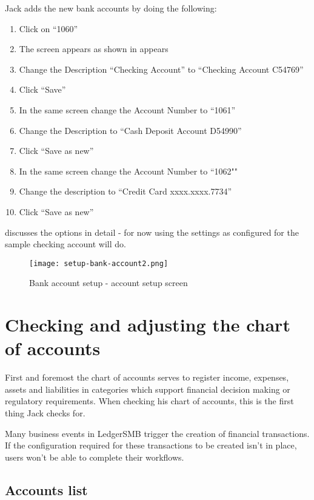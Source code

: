 Jack adds the new bank accounts by doing the following:

\begin{enumerate}
\item Click on ``1060''
\item The screen appears as shown in  appears 
\item Change the Description ``Checking Account'' to ``Checking Account C54769''
\item Click ``Save''
\item In the same screen change the Account Number to ``1061''
\item Change the Description to ``Cash Deposit Account D54990''
\item Click ``Save as new''
\item In the same screen change the Account Number to ``1062""
\item Change the description to ``Credit Card xxxx.xxxx.7734''
\item Click ``Save as new''
\end{enumerate}

 discusses the options in detail - for now using the
settings as configured for the sample checking account will do.

\begin{figure}[h]
\texttt{[image: setup-bank-account2.png]}
\caption{Bank account setup - account setup screen}
\label{fig:bank-setup2}
\end{figure}


\section{Checking and adjusting the chart of accounts}
\label{sec-first-login-coa-check}

First and foremost the chart of accounts serves to register income, expenses,
assets and liabilities in categories which support financial decision making or
regulatory requirements. When checking his chart of accounts, this is the first
thing Jack checks for.

Many business events in LedgerSMB trigger the creation of financial transactions.
If the configuration required for these transactions to be created isn't in place,
users won't be able to complete their workflows. 

\subsection{Accounts list}
\label{subsec-first-login-accounts-list}

